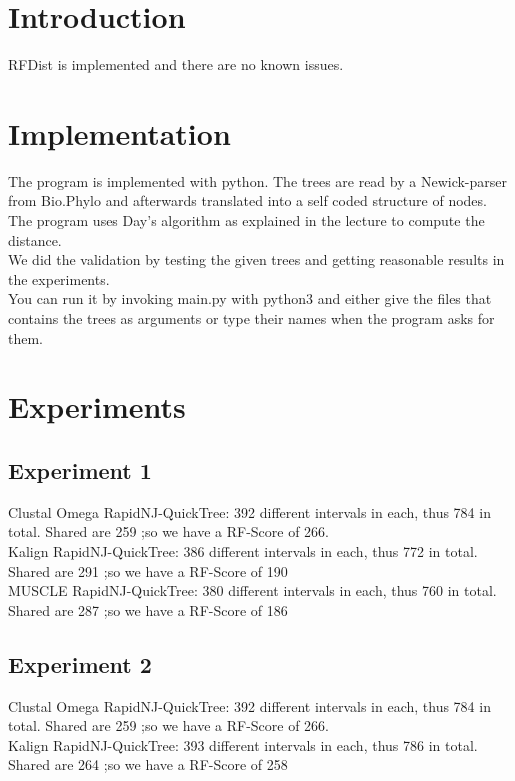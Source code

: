 \documentclass[12pt,a4paper]{article}
\begin{document}
	\section{Introduction}
	RFDist is implemented and there are no known issues.
	\section{Implementation}
	The program is implemented with python. The trees are read by a Newick-parser from Bio.Phylo and afterwards translated into a self coded structure of nodes.\\
	The program uses Day's algorithm as explained in the lecture to compute the distance.\\
	We did the validation by testing the given trees and getting reasonable results in the experiments.\\
	You can run it by invoking main.py with python3 and either give the files that contains the trees as arguments or type their names when the program asks for them.
	\section{Experiments}
	\subsection{Experiment 1}
    Clustal Omega RapidNJ-QuickTree: 392 different intervals in each, thus 784 in total. Shared are  259 ;so we have a RF-Score of 266. \\
    
    Kalign RapidNJ-QuickTree: 386 different intervals in each, thus 772 in total. Shared are  291 ;so we have a RF-Score of 190 \\
    
    MUSCLE RapidNJ-QuickTree: 380 different intervals in each, thus 760 in total. Shared are  287 ;so we have a RF-Score of 186
    \subsection{Experiment 2}
    Clustal Omega RapidNJ-QuickTree: 392 different intervals in each, thus 784 in total. Shared are  259 ;so we have a RF-Score of 266. \\
    
    Kalign RapidNJ-QuickTree: 393 different intervals in each, thus 786 in total. Shared are  264 ;so we have a RF-Score of 258 \\
    
\end{document}

